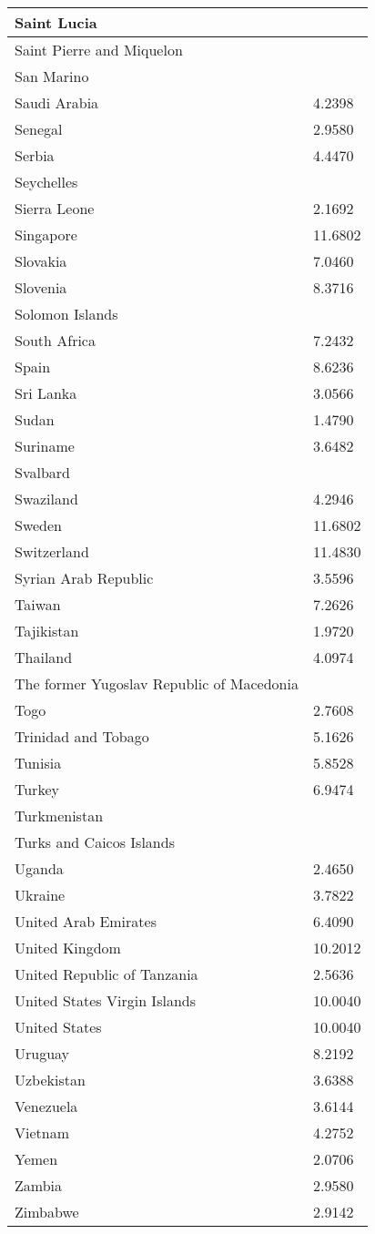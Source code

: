 \documentclass[12pt]{article}
\begin{document}
\begin{longtable}{|p{}|p{}|}
Saint Lucia& \\\hline
Saint Pierre and Miquelon& \\\hline
San Marino& \\\hline
Saudi Arabia&4.2398 \\\hline
Senegal&2.9580 \\\hline
Serbia&4.4470 \\\hline
Seychelles& \\\hline
Sierra Leone&2.1692 \\\hline
Singapore&11.6802 \\\hline
Slovakia&7.0460 \\\hline
Slovenia&8.3716 \\\hline
Solomon Islands& \\\hline
South Africa&7.2432 \\\hline
Spain&8.6236 \\\hline
Sri Lanka&3.0566 \\\hline
Sudan&1.4790 \\\hline
Suriname&3.6482 \\\hline
Svalbard& \\\hline
Swaziland&4.2946 \\\hline
Sweden&11.6802 \\\hline
Switzerland&11.4830 \\\hline
Syrian Arab Republic&3.5596 \\\hline
Taiwan&7.2626 \\\hline
Tajikistan&1.9720 \\\hline
Thailand&4.0974 \\\hline
The former Yugoslav Republic of Macedonia& \\\hline
Togo&2.7608 \\\hline
Trinidad and Tobago&5.1626 \\\hline
Tunisia&5.8528 \\\hline
Turkey&6.9474 \\\hline
Turkmenistan& \\\hline
Turks and Caicos Islands& \\\hline
Uganda&2.4650 \\\hline
Ukraine&3.7822 \\\hline
United Arab Emirates&6.4090 \\\hline
United Kingdom&10.2012 \\\hline
United Republic of Tanzania&2.5636 \\\hline
United States Virgin Islands&10.0040 \\\hline
United States&10.0040 \\\hline
Uruguay&8.2192 \\\hline
Uzbekistan&3.6388 \\\hline
Venezuela&3.6144 \\\hline
Vietnam&4.2752 \\\hline
Yemen&2.0706 \\\hline
Zambia&2.9580 \\\hline
Zimbabwe&2.9142 \\\hline
\end{longtable}

 

\end{document}
